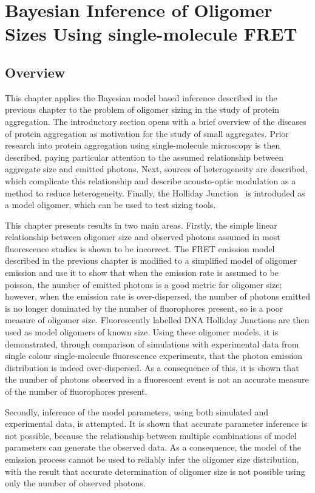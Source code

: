 \chapter{Bayesian Inference of Oligomer Sizes Using single-molecule FRET}
\label{chap:sizing}

\section{Overview}
This chapter applies the Bayesian model based inference described in the previous chapter to the problem of oligomer sizing in the study of protein aggregation. The introductory section opens with a brief overview of the diseases of protein aggregation as motivation for the study of small aggregates. Prior research into protein aggregation using single-molecule microscopy is then described, paying particular attention to the assumed relationship between aggregate size and emitted photons. Next, sources of heterogeneity are described, which complicate this relationship and describe acousto-optic modulation as a method to reduce heterogeneity. Finally, the Holliday Junction~\cite{holliday1964} is introduded as a model oligomer, which can be used to test sizing tools.

This chapter presents results in two main areas. Firstly, the simple linear relationship between oligomer size and observed photons assumed in most fluorescence studies is shown to be incorrect. The FRET emission model described in the previous chapter is modified to a simplified model of oligomer emission and use it to show that when the emission rate is assumed to be poisson, the number of emitted photons is a good metric for oligomer size; however, when the emission rate is over-dispersed, the number of photons emitted is no longer dominated by the number of fluorophores present, so is a poor measure of oligomer size. Fluorescently labelled DNA Holliday Junctions are then used as model oligomers of known size. Using these oligomer models, it is demonstrated, through comparison of simulations with experimental data from single colour single-molecule fluorescence experiments, that the photon emission distribution is indeed over-dispersed. As a consequence of this, it is shown that the number of photons observed in a fluorescent event is not an accurate measure of the number of fluorophores present. 

Secondly, inference of the model parameters, using both simulated and experimental data, is attempted. It is shown that accurate parameter inference is not possible, because the relationship between multiple combinations of model parameters can generate the observed data. As a consequence, the model of the emission process cannot be used to reliably infer the oligomer size distribution, with the result that accurate determination of oligomer size is not possible using only the number of observed photons.

